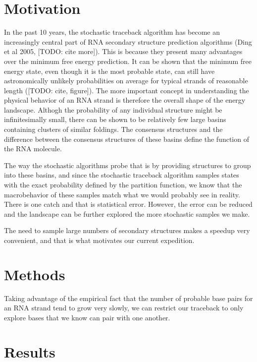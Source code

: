 \section{Motivation}

In the past 10 years, the stochastic traceback algorithm has become an
increasingly central part of RNA secondary structure prediction
algorithms (Ding et al 2005, [TODO: cite more]). This is because they
present many advantages over the minimum free energy prediction. It
can be shown that the minimum free energy state, even though it is the
most probable state, can still have astronomically unlikely
probabilities on average for typical strands of reasonable length
([TODO: cite, figure]). The more important concept in understanding
the physical behavior of an RNA strand is therefore the overall shape
of the energy landscape. Althogh the probability of any individual
structure might be infinitesimally small, there can be shown to be
relatively few large basins containing clusters of similar foldings.
The consensus structures and the difference between the consensus
structures of these basins define the function of the RNA molecule.

The way the stochastic algorithms probe that is by providing
structures to group into these basins, and since the stochastic
traceback algorithm samples states with the exact probability defined
by the partition function, we know that the macrobehavior of these
samples match what we would probably see in reality. There is one
catch and that is statistical error. However, the error can be reduced
and the landscape can be further explored the more stochastic samples
we make.

The need to sample large numbers of secondary structures makes a
speedup very convenient, and that is what motivates our current
expedition.

\section{Methods}

Taking advantage of the empirical fact that the number of probable
base pairs for an RNA strand tend to grow very slowly, we can restrict
our traceback to only explore bases that we know can pair with one
another.

\section{Results}

